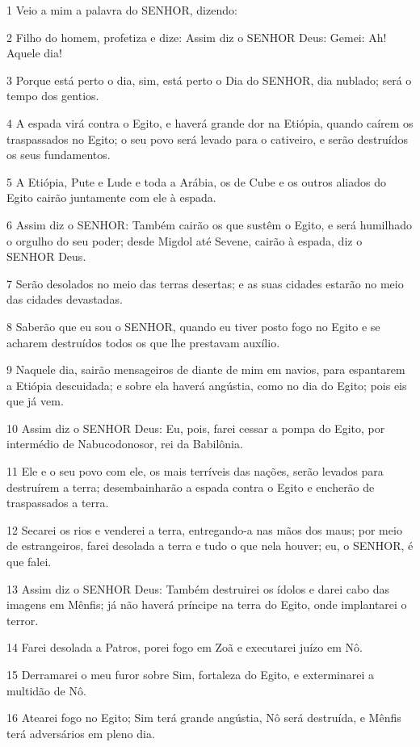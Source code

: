 \par 1 Veio a mim a palavra do SENHOR, dizendo:
\par 2 Filho do homem, profetiza e dize: Assim diz o SENHOR Deus: Gemei: Ah! Aquele dia!
\par 3 Porque está perto o dia, sim, está perto o Dia do SENHOR, dia nublado; será o tempo dos gentios.
\par 4 A espada virá contra o Egito, e haverá grande dor na Etiópia, quando caírem os traspassados no Egito; o seu povo será levado para o cativeiro, e serão destruídos os seus fundamentos.
\par 5 A Etiópia, Pute e Lude e toda a Arábia, os de Cube e os outros aliados do Egito cairão juntamente com ele à espada.
\par 6 Assim diz o SENHOR: Também cairão os que sustêm o Egito, e será humilhado o orgulho do seu poder; desde Migdol até Sevene, cairão à espada, diz o SENHOR Deus.
\par 7 Serão desolados no meio das terras desertas; e as suas cidades estarão no meio das cidades devastadas.
\par 8 Saberão que eu sou o SENHOR, quando eu tiver posto fogo no Egito e se acharem destruídos todos os que lhe prestavam auxílio.
\par 9 Naquele dia, sairão mensageiros de diante de mim em navios, para espantarem a Etiópia descuidada; e sobre ela haverá angústia, como no dia do Egito; pois eis que já vem.
\par 10 Assim diz o SENHOR Deus: Eu, pois, farei cessar a pompa do Egito, por intermédio de Nabucodonosor, rei da Babilônia.
\par 11 Ele e o seu povo com ele, os mais terríveis das nações, serão levados para destruírem a terra; desembainharão a espada contra o Egito e encherão de traspassados a terra.
\par 12 Secarei os rios e venderei a terra, entregando-a nas mãos dos maus; por meio de estrangeiros, farei desolada a terra e tudo o que nela houver; eu, o SENHOR, é que falei.
\par 13 Assim diz o SENHOR Deus: Também destruirei os ídolos e darei cabo das imagens em Mênfis; já não haverá príncipe na terra do Egito, onde implantarei o terror.
\par 14 Farei desolada a Patros, porei fogo em Zoã e executarei juízo em Nô.
\par 15 Derramarei o meu furor sobre Sim, fortaleza do Egito, e exterminarei a multidão de Nô.
\par 16 Atearei fogo no Egito; Sim terá grande angústia, Nô será destruída, e Mênfis terá adversários em pleno dia.
